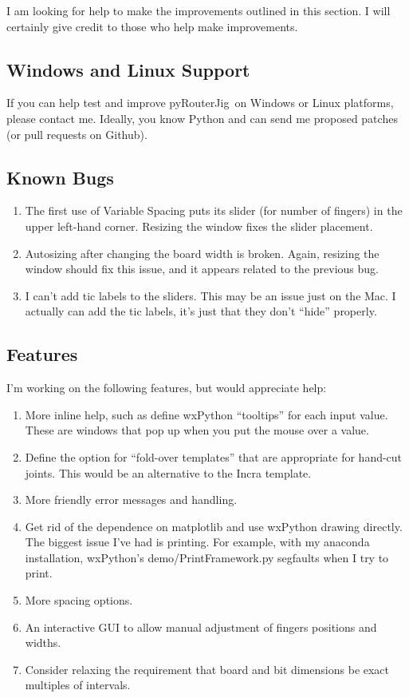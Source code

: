 \documentclass[12pt,final]{article}
\newcommand{\codename}[0]{pyRouterJig}
\begin{document}
I am looking for help to make the improvements outlined in this section.  I
will certainly give credit to those who help make improvements.

\subsection{Windows and Linux Support}

If you can help test and improve \codename~on Windows or Linux platforms,
please contact me.  Ideally, you know Python and can send me proposed patches
(or pull requests on Github).

\subsection{Known Bugs}

\begin{enumerate}
\item The first use of Variable Spacing puts its slider (for number of
  fingers) in the upper left-hand
  corner.  Resizing the window fixes the slider placement.
\item Autosizing after changing the board width is broken.  Again, resizing
  the window should fix this issue, and it appears related to the previous bug.
\item I can't add tic labels to the sliders.  This may be an issue just on
  the Mac.  I actually can add the tic labels, it's just that they don't
  ``hide'' properly.
\end{enumerate}

\subsection{Features}

I'm working on the following features, but would appreciate help:

\begin{enumerate}
\item More inline help, such as define wxPython ``tooltips'' for each input
  value.  These are windows that pop up when you put the mouse over a value.
\item Define the option for ``fold-over templates'' that are appropriate for
  hand-cut joints.  This would be an alternative to the Incra template.
\item More friendly error messages and handling.
\item Get rid of the dependence on matplotlib and use wxPython drawing
  directly.  The biggest issue I've had is printing.  For example, with my
  anaconda installation, wxPython's demo/PrintFramework.py segfaults when I
  try to print.
\item More spacing options.
\item An interactive GUI to allow manual adjustment of fingers positions and
  widths.
\item Consider relaxing the requirement that board and bit dimensions be exact multiples
of intervals.
\end{enumerate}
\end{document}
